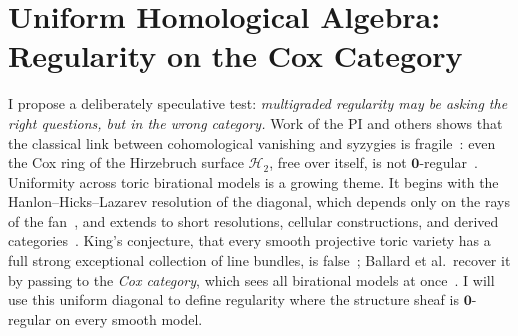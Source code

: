 \documentclass[11pt,reqno]{amsart}
\theoremstyle{remark}
\newcommand{\zero}{\mathbf{0}}
\newcommand{\cH}{\mathcal{H}}
\begin{document}
\section{Uniform Homological Algebra: Regularity on the Cox Category}
\label{sec:uniform-homological-algebra-on-toric}

%

I propose a deliberately speculative test: \emph{multigraded regularity may be asking the right questions, but in the wrong category.} Work of the PI and others shows that the classical link between cohomological vanishing and syzygies is fragile~\cite{maclaganSmith04,bruceHellerSayrafi26,bruceHellerSayrafi22}: even the Cox ring of the Hirzebruch surface $\cH_2$, free over itself, is not $\zero$-regular~\cite[Ex.~4.3]{maclaganSmith04}. Uniformity across toric birational models is a growing theme. It begins with the Hanlon--Hicks--Lazarev resolution of the diagonal, which depends only on the rays of the fan~\cite{HHL24}, and extends to short resolutions, cellular constructions, and derived categories~\cite{brownErman24-1,faveroHuang23,faveroHuang25,faveroSapronov24,CH25,borisovHan25,berkeschHellerSmithYang25,han26,EHLZ25}. King's conjecture, that every smooth projective toric variety has a full strong exceptional collection of line bundles, is false~\cite{hillePerling06,mateusz11}; Ballard et al.\ recover it by passing to the \emph{Cox category}, which sees all birational models at once~\cite{longLiveKing}. I will use this uniform diagonal to define regularity where the structure sheaf is $\zero$-regular on every smooth model.
\end{document}
